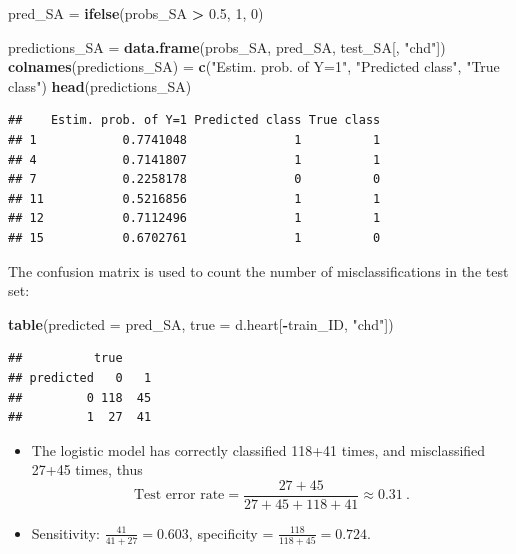 \documentclass[10pt,ignorenonframetext,]{beamer}
\newenvironment{Shaded}{\begin{snugshade}}{\end{snugshade}}
\newcommand{\KeywordTok}[1]{\textcolor[rgb]{0.13,0.29,0.53}{\textbf{#1}}}
\newcommand{\DataTypeTok}[1]{\textcolor[rgb]{0.13,0.29,0.53}{#1}}
\newcommand{\DecValTok}[1]{\textcolor[rgb]{0.00,0.00,0.81}{#1}}
\newcommand{\FloatTok}[1]{\textcolor[rgb]{0.00,0.00,0.81}{#1}}
\newcommand{\StringTok}[1]{\textcolor[rgb]{0.31,0.60,0.02}{#1}}
\newcommand{\OperatorTok}[1]{\textcolor[rgb]{0.81,0.36,0.00}{\textbf{#1}}}
\newcommand{\NormalTok}[1]{#1}
\providecommand{\tightlist}{%
  \setlength{\itemsep}{0pt}\setlength{\parskip}{0pt}}
\begin{document}
\begin{frame}[fragile]

\scriptsize

\begin{Shaded}
\begin{Highlighting}[]
\NormalTok{pred_SA =}\StringTok{ }\KeywordTok{ifelse}\NormalTok{(probs_SA }\OperatorTok{>}\StringTok{ }\FloatTok{0.5}\NormalTok{, }\DecValTok{1}\NormalTok{, }\DecValTok{0}\NormalTok{)}

\NormalTok{predictions_SA =}\StringTok{ }\KeywordTok{data.frame}\NormalTok{(probs_SA, pred_SA, test_SA[, }\StringTok{"chd"}\NormalTok{])}
\KeywordTok{colnames}\NormalTok{(predictions_SA) =}\StringTok{ }\KeywordTok{c}\NormalTok{(}\StringTok{"Estim. prob. of Y=1"}\NormalTok{, }\StringTok{"Predicted class"}\NormalTok{, }
    \StringTok{"True class"}\NormalTok{)}
\KeywordTok{head}\NormalTok{(predictions_SA)}
\end{Highlighting}
\end{Shaded}

\begin{verbatim}
##    Estim. prob. of Y=1 Predicted class True class
## 1            0.7741048               1          1
## 4            0.7141807               1          1
## 7            0.2258178               0          0
## 11           0.5216856               1          1
## 12           0.7112496               1          1
## 15           0.6702761               1          0
\end{verbatim}

\end{frame}

\begin{frame}[fragile]

The confusion matrix is used to count the number of misclassifications
in the test set:

\scriptsize

\begin{Shaded}
\begin{Highlighting}[]
\KeywordTok{table}\NormalTok{(}\DataTypeTok{predicted =}\NormalTok{ pred_SA, }\DataTypeTok{true =}\NormalTok{ d.heart[}\OperatorTok{-}\NormalTok{train_ID, }\StringTok{"chd"}\NormalTok{])}
\end{Highlighting}
\end{Shaded}

\begin{verbatim}
##          true
## predicted   0   1
##         0 118  45
##         1  27  41
\end{verbatim}

\normalsize

\begin{itemize}
\tightlist
\item
  The logistic model has correctly classified 118+41 times, and
  misclassified 27+45 times, thus
  \[\text{Test error rate} = \frac{27+45}{27+45+118+41} \approx 0.31 \ .\]
\item
  Sensitivity: \(\frac{41}{41+27}=0.603\), specificity =
  \(\frac{118}{118+45}=0.724.\)
\end{itemize}

\end{frame}
\end{document}
